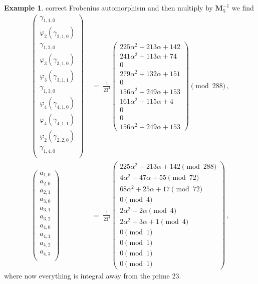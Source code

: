 \documentclass[12pt,reqno]{amsart}
\theoremstyle{definition}
\newtheorem{example}[proposition]{Example}
\def\bM{\mathbf{M}}
\def\be{\begin{equation}}
\def\ee{\end{equation}}
\def\={\;=\;}
\begin{document}
\begin{example}
correct Frobenius automorphism and then multiply by $\bM_{5}^{-1}$ we find
\be
\begin{aligned}
\left(
\begin{array}{c}
\gamma_{1,1,0}\\
\hline
\varphi_2(\gamma_{2,1,0})\\
\gamma_{1,2,0}\\
\hline
\varphi_3(\gamma_{3,1,0})\\
\varphi_3(\gamma_{3,1,1})\\
\gamma_{1,3,0}\\
\hline
\varphi_4(\gamma_{4,1,0})\\
\varphi_4(\gamma_{4,1,1})\\
\varphi_2(\gamma_{2,2,0})\\
\gamma_{1,4,0}\\
\end{array}
\right)
&\=
\frac{1}{23^4}\left(
\begin{array}{c}
 225\alpha^2 + 213\alpha + 142\\
 241\alpha^2 + 113\alpha + 74\\
 0\\
 279\alpha^2 + 132\alpha + 151\\
 0\\
 156\alpha^2 + 249\alpha + 153\\
 161\alpha^2 + 115\alpha + 4\\
 0\\
 0\\
 156\alpha^2 + 249\alpha + 153
\end{array}
\right)\pmod{288}\,,\\
\left(
\begin{array}{c}
a_{1,0}\\
\hline
a_{2,0}\\
a_{2,1}\\
\hline
a_{3,0}\\
a_{3,1}\\
a_{3,2}\\
\hline
a_{4,0}\\
a_{4,1}\\
a_{4,2}\\
a_{4,3}\\
\end{array}
\right)
&\=
\frac{1}{23^4}
\left(
\begin{array}{c}
 225\alpha^2 + 213\alpha + 142\pmod{288}\\
 4\alpha^2 + 47\alpha + 55\pmod{72}\\
 68\alpha^2 + 25\alpha + 17\pmod{72}\\
 0\pmod{4}\\
 2\alpha^2 + 2\alpha \pmod{4}\\
 2\alpha^2 + 3\alpha + 1\pmod{4}\\
 0\pmod{1}\\
 0\pmod{1}\\
 0\pmod{1}\\
 0\pmod{1}
\end{array}
\right)\,,
\end{aligned}
\ee
where now everything is integral away from the prime $23$.
\end{example}
\end{document}
